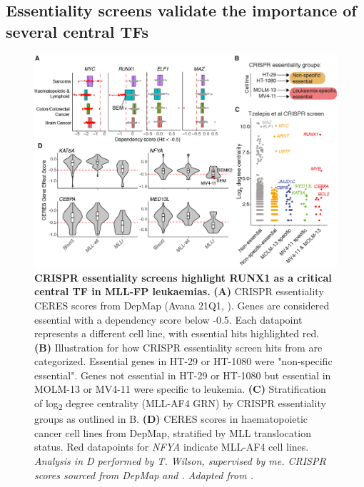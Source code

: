 \subsection{\label{ch4:essential}Essentiality screens validate the importance of several central TFs}

\begin{figure}[!t]
    \centering
    \includegraphics[width=\textwidth,height=\textheight,keepaspectratio]{figures/chapter4/ch4_essentiality.png}
    \caption[{Essential genes.}]
    {\textbf{CRISPR essentiality screens highlight RUNX1 as a critical central TF in MLL-FP leukaemias.} 
    \textbf{(A)} CRISPR essentiality CERES scores from DepMap (Avana 21Q1, \cite{meyers_computational_2017, doench_optimized_2016}). Genes are considered essential with a dependency score below -0.5. Each datapoint represents a different cell line, with essential hits highlighted red.
    \textbf{(B)} Illustration for how CRISPR essentiality screen hits from \cite{tzelepis_crispr_2016} are categorized. Essential genes in HT-29 or HT-1080 were "non-specific essential". Genes not essential in HT-29 or HT-1080 but essential in MOLM-13 or MV4-11 were specific to leukemia. 
    \textbf{(C)} Stratification of log\textsubscript{2} degree centrality (MLL-AF4 GRN) by CRISPR essentiality groups as outlined in B. 
    \textbf{(D)} CERES scores in haematopoietic cancer cell lines from DepMap, stratified by MLL translocation status. Red datapoints for \textit{NFYA} indicate MLL-AF4 cell lines. 
    \textit{Analysis in D performed by T. Wilson, supervised by me. CRISPR scores sourced from DepMap and \cite{tzelepis_crispr_2016}. Adapted from \cite{harman_kmt2a-aff1_2021}.} 
    }
    \label{fig:ch4_essentiality}
\end{figure}

